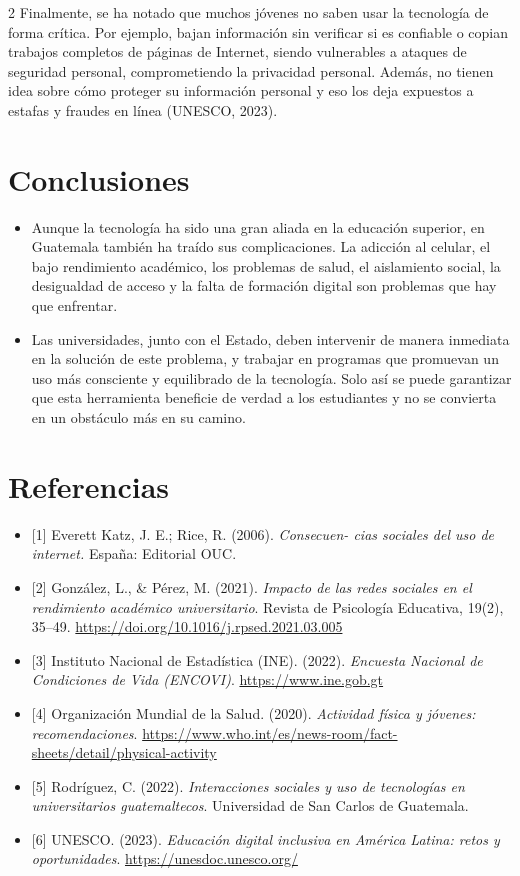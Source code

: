 \documentclass[12pt,spanish,Letterpaper,openany]{book}
\begin{document}
\begin {multicols}{2}
Finalmente, se ha notado que muchos jóvenes no saben usar la tecnología de forma crítica. Por ejemplo, bajan información sin verificar si es confiable o copian trabajos completos de páginas de Internet, siendo vulnerables a ataques de seguridad personal, comprometiendo la privacidad personal. Además, no tienen idea sobre cómo proteger su información personal y eso los deja expuestos a estafas y fraudes en línea (UNESCO, 2023).

\hypertarget{conclusiones}{%
\section{Conclusiones}\label{conclusiones}}

\begin{itemize}
\item
  Aunque la tecnología ha sido una gran aliada en la educación superior, en Guatemala también ha traído sus complicaciones. La adicción al celular, el bajo rendimiento académico, los problemas de salud, el aislamiento social, la desigualdad de acceso y la falta de formación digital son problemas que hay que enfrentar.
\item
  Las universidades, junto con el Estado, deben intervenir de manera inmediata en la solución de este problema, y trabajar en programas que promuevan un uso más consciente y equilibrado de la tecnología. Solo así se puede garantizar que esta herramienta beneficie de verdad a los estudiantes y no se convierta en un obstáculo más en su camino.
\end{itemize}

\hypertarget{referencias}{%
\section{Referencias}\label{referencias}}

\begin{itemize}
\item
  {[}1{]} Everett Katz, J. E.; Rice, R. (2006). \emph{Consecuen-
  cias sociales del uso de internet.} España: Editorial OUC.
\item
  {[}2{]} González, L., \& Pérez, M. (2021). \emph{Impacto de las redes sociales en el rendimiento académico universitario}. Revista de Psicología Educativa, 19(2), 35--49. \url{https://doi.org/10.1016/j.rpsed.2021.03.005}
\item
  {[}3{]} Instituto Nacional de Estadística (INE). (2022). \emph{Encuesta Nacional de Condiciones de Vida (ENCOVI)}. \url{https://www.ine.gob.gt}
\item
  {[}4{]} Organización Mundial de la Salud. (2020). \emph{Actividad física y jóvenes: recomendaciones}. \url{https://www.who.int/es/news-room/fact-sheets/detail/physical-activity}
\item
  {[}5{]} Rodríguez, C. (2022). \emph{Interacciones sociales y uso de tecnologías en universitarios guatemaltecos}. Universidad de San Carlos de Guatemala.
\item
  {[}6{]} UNESCO. (2023). \emph{Educación digital inclusiva en América Latina: retos y oportunidades}. \url{https://unesdoc.unesco.org/}
\end{itemize}


\end{multicols}
\end{document}
